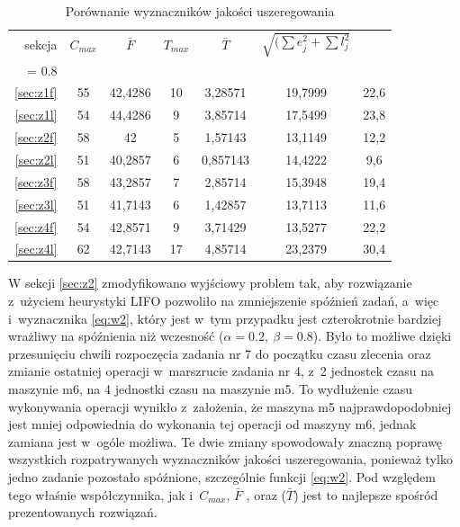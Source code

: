 \documentclass[twoside]{kInzynierka}
\begin{document}
\begin{table}[htb]
	\centering
	\caption{Porównanie wyznaczników jakości uszeregowania}
	\begin{tabular}{ r | c | c | c | c | c | c }
	sekcja        & \(C_{max}\)	& \(\bar{F}\)   & \(T_{max}\) & \(\bar{T}\) & \(\sqrt{(\sum e_j^2 + \sum l_j^2}\) & \( \alpha*\sum e_j + \beta*\sum l_j \Big|_{\substack{\alpha = 0.2\\ \beta = 0.8}} \) \\ \hline
	\ref{sec:z1f} & 55          & 42,4286       & 10          & 3,28571      & 19,7999      & 22,6 \\ 
	\ref{sec:z1l} & 54          & 44,4286       & 9           & 3,85714      & 17,5499      & 23,8 \\ \hline
	\ref{sec:z2f} & 58          & 42            & 5           & 1,57143      & 13,1149      & 12,2 \\ 
    \ref{sec:z2l} & 51          & 40,2857       & 6           & 0,857143     & 14,4222      & 9,6  \\ \hline
	\ref{sec:z3f} & 58          & 43,2857       & 7           & 2,85714      & 15,3948      & 19,4 \\ 
	\ref{sec:z3l} & 51          & 41,7143       & 6           & 1,42857      & 13,7113      & 11,6 \\ \hline
	\ref{sec:z4f} & 54          & 42,8571       & 9           & 3,71429      & 13,5277      & 22,2 \\ 
	\ref{sec:z4l} & 62          & 42,7143       & 17          & 4,85714      & 23,2379      & 30,4 \\ 
	\end{tabular}
\end{table}

W sekcji \ref{sec:z2} zmodyfikowano wyjściowy problem tak, aby rozwiązanie z~użyciem heurystyki LIFO pozwoliło na zmniejszenie spóźnień zadań, a~więc i~wyznacznika \eqref{eq:w2}, który jest w~tym przypadku jest czterokrotnie bardziej wrażliwy na spóźnienia niż wczesność (\(\alpha = 0.2,~\beta = 0.8\)). Było to możliwe dzięki przesunięciu chwili rozpoczęcia zadania nr 7 do początku czasu zlecenia oraz zmianie ostatniej operacji w~marszrucie zadania nr 4, z~2 jednostek czasu na maszynie m6, na 4 jednostki czasu na maszynie m5. To wydłużenie czasu wykonywania operacji wynikło z~założenia, że maszyna m5 najprawdopodobniej jest mniej odpowiednia do wykonania tej operacji od maszyny m6, jednak zamiana jest w~ogóle możliwa. Te dwie zmiany spowodowały znaczną poprawę wszystkich rozpatrywanych wyznaczników jakości uszeregowania, ponieważ tylko jedno zadanie pozostało spóźnione, szczególnie funkcji \eqref{eq:w2}. Pod względem tego właśnie współczynnika, jak i~\(C_{max}\), \(\bar{F}\) , oraz (\(\bar{T}\)) jest to najlepsze spośród prezentowanych rozwiązań.
\end{document}
